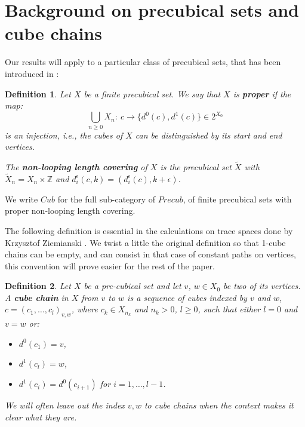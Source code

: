 \documentclass{article}
\newtheorem{definition}{Definition}[section]
\newcommand\look[1]{{\bf #1}}
\def\Z{\mbox{$\mathbb{Z}$}}
\begin{document}
\section{Background on precubical sets and cube chains}

\label{sec:background}

Our results will apply to a particular class of precubical sets, that has been introduced in \cite{cubechains}: 

\begin{definition}
Let $X$ be a finite precubical set. We say that $X$ is \look{proper} if the map: 
$$
\bigcup\limits_{n\geq 0} X_n : \ c \rightarrow \{d^0(c),d^1(c)\} \in 2^{X_0}$$
\noindent is an injection, i.e., the cubes of $X$ can be distinguished by its start and end vertices. 

The \look{non-looping length covering} of $X$ is the precubical set $\tilde{X}$ with $\tilde{X}_n=X_n\times \Z$ and $d^\epsilon_i(c,k)=(d^\epsilon_i(c),k+\epsilon)$.
\end{definition}

We write ${Cub}$ for the full sub-category of $Precub$, of finite precubical sets with proper non-looping length covering. 


The following definition is essential in the calculations on trace spaces done by Krzysztof Ziemianski \cite{cubechains}. We twist a little the original definition so that 1-cube chains can be empty, and can consist in that case of constant paths on vertices, this convention will prove easier for the rest of the paper. 

\begin{definition}
Let $X$ be a pre-cubical set and let $v$, $w \in X_0$ be two of its vertices. A \look{cube chain} in $X$ from $v$ to $w$ is a sequence of cubes indexed by $v$ and $w$, $c = (c_1,\ldots,c_l)_{v,w}$, where $c_k \in X_{n_k}$ and $n_k > 0$, $l\geq 0$, such that either $l=0$ and $v=w$ or: 
\begin{itemize}
    \item $d^0(c_1) = v$,
\item $d^1(c_l)=w$,
\item $d^1(c_i) = d^0(c_{i+1})$ for $i = 1,\ldots, l - 1$.
\end{itemize}
We will often leave out the index $v,w$ to cube chains when the context makes it clear what they are. 
\end{definition}
\end{document}

